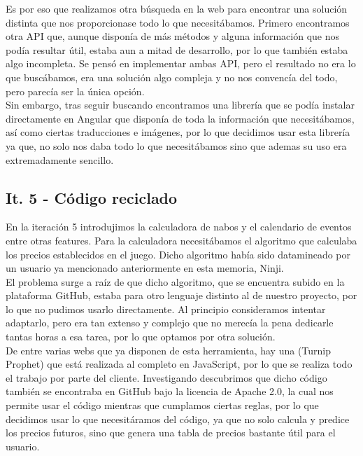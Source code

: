 Es por eso que realizamos otra búsqueda en la web para encontrar una solución distinta que nos proporcionase todo lo que necesitábamos. Primero encontramos otra API que, aunque disponía de más métodos y alguna información que nos podía resultar útil, estaba aun a mitad de desarrollo, por lo que también estaba algo incompleta. Se pensó en implementar ambas API, pero el resultado no era lo que buscábamos, era una solución algo compleja y no nos convencía del todo, pero parecía ser la única opción.\\

Sin embargo, tras seguir buscando encontramos una librería que se podía instalar directamente en Angular que disponía de toda la información que necesitábamos, así como ciertas traducciones e imágenes, por lo que decidimos usar esta librería ya que, no solo nos daba todo lo que necesitábamos sino que ademas su uso era extremadamente sencillo. 

\subsection{It. 5 - Código reciclado}

En la iteración 5 introdujimos la calculadora de nabos y el calendario de eventos entre otras features. Para la calculadora necesitábamos el algoritmo que calculaba los precios establecidos en el juego. Dicho algoritmo había sido datamineado por un usuario ya mencionado anteriormente en esta memoria, Ninji.\\

El problema surge a raíz de que dicho algoritmo, que se encuentra subido en la plataforma GitHub, estaba para otro lenguaje distinto al de nuestro proyecto, por lo que no pudimos usarlo directamente. Al principio consideramos intentar adaptarlo, pero era tan extenso y complejo que no merecía la pena dedicarle tantas horas a esa tarea, por lo que optamos por otra solución.\\

De entre varias webs que ya disponen de esta herramienta, hay una (Turnip Prophet) que está realizada al completo en JavaScript, por lo que se realiza todo el trabajo por parte del cliente. Investigando descubrimos que dicho código también se encontraba en GitHub bajo la licencia de Apache 2.0, la cual nos permite usar el código mientras que cumplamos ciertas reglas, por lo que decidimos usar lo que necesitáramos del código, ya que no solo calcula y predice los precios futuros, sino que genera una tabla de precios bastante útil para el usuario.\\

